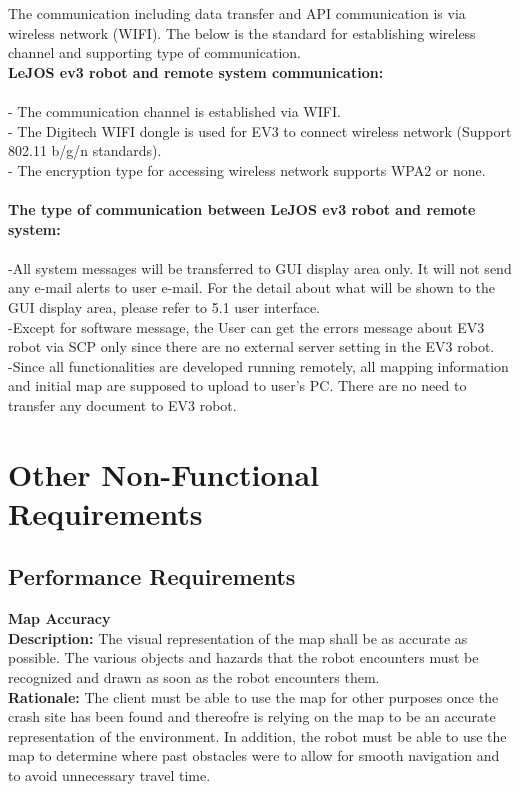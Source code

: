 \documentclass[10pt,a4paper,titlepage]{article}
\begin{document}
The communication including data transfer and API communication is via wireless network (WIFI). The below is the standard for establishing wireless channel and supporting type of communication.\\

\textbf{LeJOS ev3 robot and remote system communication:}\\\\
-	The communication channel is established via WIFI.\\
-	The Digitech WIFI dongle is used for EV3 to connect wireless network (Support 802.11 b/g/n standards).\\
-	The encryption type for accessing wireless network supports WPA2 or none.\\\\
\textbf{The type of communication between LeJOS ev3 robot and remote system:}\\\\
-All system messages will be transferred to GUI display area only. It will not send any e-mail alerts to user e-mail. For the detail about what will be shown to the GUI display area, please refer to 5.1 user interface.\\
-Except for software message, the User can get the errors message about EV3 robot via SCP only since there are no external server setting in the EV3 robot.\\
-Since all functionalities are developed running remotely, all mapping information and initial map are supposed to upload to user’s PC. There are no need to transfer any document to EV3 robot.\\

	\section{Other Non-Functional Requirements}
	\subsection{Performance Requirements}
		
		\textbf {Map Accuracy}\\
		\textbf {Description:} The visual representation of the map shall be as accurate as possible. The various objects and hazards that the robot encounters must be recognized and drawn as soon as the robot encounters them.\\
		\textbf {Rationale:} The client must be able to use the map for other purposes once the crash site has been found and thereofre is relying on the map to be an accurate representation of the environment. In addition, the robot must be able to use the map to determine where past obstacles were to allow for smooth navigation and to avoid unnecessary travel time.\\
\end{document}
